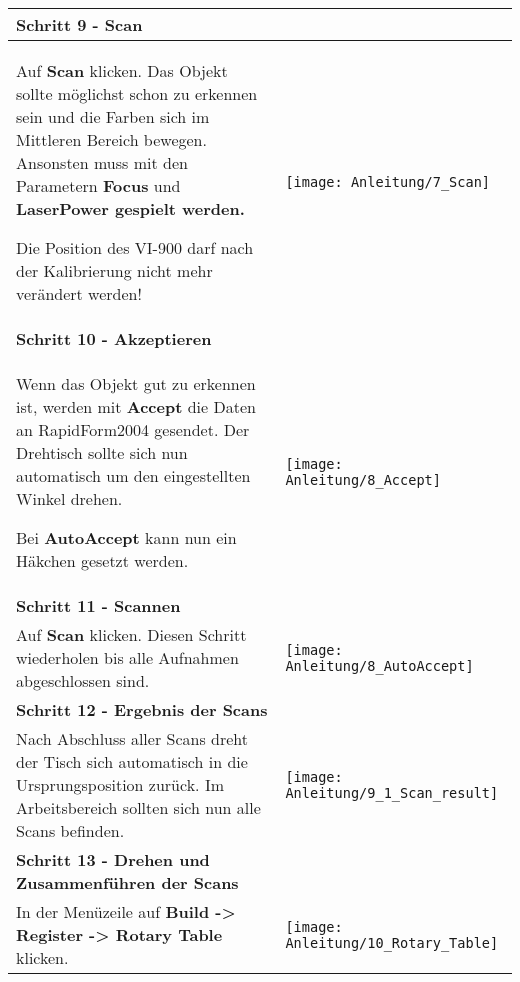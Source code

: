 \begin{longtable}{|>{\RaggedRight}m{5cm}|m{8cm}|}
\pagebreak 


\multicolumn{2}{|l|}%
{{\textbf{Schritt 9 - Scan}}}
\\ \hline
Auf \textbf{Scan} klicken. \linebreak
Das Objekt sollte möglichst schon zu erkennen sein und die Farben sich im Mittleren Bereich bewegen. \linebreak
Ansonsten muss mit den Parametern \textbf{Focus} und \textbf{LaserPower gespielt werden.}
\begin{TippS}Die Position des VI-900 darf nach der Kalibrierung nicht mehr verändert werden!\end{TippS}
& 
\texttt{[image: Anleitung/7\_Scan]}
\\ \hline  

\multicolumn{2}{|l|}%
{{\textbf{Schritt 10 - Akzeptieren}}}
\\ \hline
Wenn das Objekt gut zu erkennen ist, werden mit \textbf{Accept} die Daten an RapidForm2004 gesendet. Der Drehtisch sollte sich nun automatisch um den eingestellten Winkel drehen. 
\begin{TippS}Bei \textbf{AutoAccept} kann nun ein Häkchen gesetzt werden.\end{TippS}
& 
\texttt{[image: Anleitung/8\_Accept]}
\\ \hline  

\pagebreak 


\multicolumn{2}{|l|}%
{{\textbf{Schritt 11 - Scannen}}}
\\ \hline
Auf \textbf{Scan} klicken.\linebreak
Diesen Schritt wiederholen bis alle Aufnahmen abgeschlossen sind.\linebreak
& 
\texttt{[image: Anleitung/8\_AutoAccept]}
\\ \hline  

\multicolumn{2}{|l|}%
{{\textbf{Schritt 12 - Ergebnis der Scans}}}
\\ \hline
Nach Abschluss aller Scans dreht der Tisch sich automatisch in die Ursprungsposition zurück.\linebreak
Im Arbeitsbereich sollten sich nun alle Scans befinden.
& 
\texttt{[image: Anleitung/9\_1\_Scan\_result]}
\\ \hline  

\pagebreak 


\multicolumn{2}{|l|}%
{{\textbf{Schritt 13 - Drehen und Zusammenführen der Scans}}}
\\ \hline
In der Menüzeile auf \textbf{Build -> Register -> Rotary Table} klicken.\linebreak
& 
\texttt{[image: Anleitung/10\_Rotary\_Table]}
\\ \hline  


\end{longtable}
